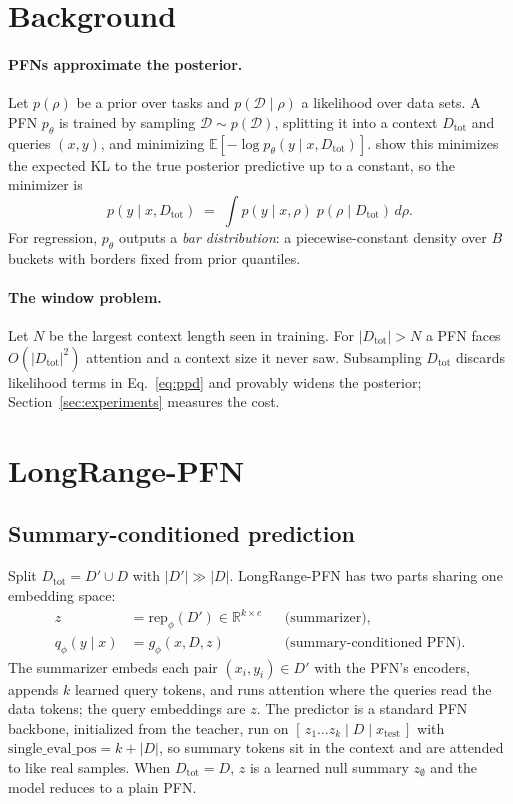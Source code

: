 \documentclass{article}
\newcommand{\Dtot}{D_{\mathrm{tot}}}
\newcommand{\Dfar}{D'}
\newcommand{\Dloc}{D}
\newcommand{\rep}{\mathrm{rep}}
\begin{document}
\section{Background}
\label{sec:background}

\paragraph{PFNs approximate the posterior.} Let $p(\rho)$ be a prior over tasks
and $p(\mathcal{D} \mid \rho)$ a likelihood over data sets. A PFN $p_\theta$ is
trained by sampling $\mathcal{D} \sim p(\mathcal{D})$, splitting it into a
context $\Dtot$ and queries $(x, y)$, and minimizing
$\mathbb{E}[-\log p_\theta(y \mid x, \Dtot)]$. \citet{muller2022pfn} show this
minimizes the expected KL to the true posterior predictive up to a constant, so
the minimizer is
\begin{equation}
\label{eq:ppd}
  p(y \mid x, \Dtot) \;=\; \int p(y \mid x, \rho)\; p(\rho \mid \Dtot)\, d\rho .
\end{equation}
For regression, $p_\theta$ outputs a \emph{bar distribution}: a
piecewise-constant density over $B$ buckets with borders fixed from prior
quantiles.

\paragraph{The window problem.} Let $N$ be the largest context length seen in
training. For $|\Dtot| > N$ a PFN faces $O(|\Dtot|^2)$ attention and a context
size it never saw. Subsampling $\Dtot$ discards likelihood terms in
Eq.~\eqref{eq:ppd} and provably widens the posterior;
Section~\ref{sec:experiments} measures the cost.

\section{LongRange-PFN}
\label{sec:method}

\subsection{Summary-conditioned prediction}
\label{sec:summary}

Split $\Dtot = \Dfar \cup \Dloc$ with $|\Dfar| \gg |\Dloc|$. LongRange-PFN has
two parts sharing one embedding space:
\begin{align}
  z &= \rep_\phi(\Dfar) \in \mathbb{R}^{k \times e}
  &&\text{(summarizer)},\\
  q_\phi(y \mid x) &= g_\phi(x, \Dloc, z)
  &&\text{(summary-conditioned PFN)}.
\end{align}
The summarizer embeds each pair $(x_i, y_i) \in \Dfar$ with the PFN's encoders,
appends $k$ learned query tokens, and runs attention where the queries read the
data tokens; the query embeddings are $z$. The predictor is a standard PFN
backbone, initialized from the teacher, run on
$[\, z_1 \dots z_k \mid \Dloc \mid x_{\mathrm{test}} \,]$ with
$\text{single\_eval\_pos} = k + |\Dloc|$, so summary tokens sit in the context
and are attended to like real samples. When $\Dtot = \Dloc$, $z$ is a learned
null summary $z_\emptyset$ and the model reduces to a plain PFN.
\end{document}
